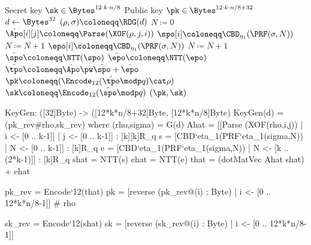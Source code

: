 \begin{algorithm}
  \caption{$\KyberCPAPKE.\PKEGen()$: key generation
  \label{kybercpa-gen}}
  \begin{algorithmic}[1]
    \Ensure Secret key $\sk \in \Bytes^{12\cdot k\cdot n/8}$
    \Ensure Public key $\pk \in \Bytes^{12\cdot k\cdot n/8 + 32}$
    \State $d \gets \Bytes^{32}$                  \label{line:secretrandomness}
    \State $(\rho, \sigma) \coloneqq \ROG(d)$ 
    \State $N \coloneqq 0$
               
      \State $\hat{\Apo}[i][j] \coloneqq \Parse(\XOF(\rho, j, i))$
    \EndFor
    \EndFor
               
    \State $\spo[i] \coloneqq \CBD_{\eta_1}(\PRF(\sigma, N))$
    \State $N \coloneqq N+1$
    \EndFor
               
    \State $\epo[i] \coloneqq \CBD_{\eta_1}(\PRF(\sigma, N))$
    \State $N \coloneqq N+1$
    \EndFor
    \State $\hat{\spo} \coloneqq \NTT(\spo)$\label{line:kybercpa-gen:ntts}
    \State $\hat{\epo} \coloneqq \NTT(\epo)$
    \State $\hat{\tpo} \coloneqq \hat{\Apo} \pw \hat{\spo} + \hat{\epo}$\label{line:kybercpa-gen:invnttas}
    \State $\pk \coloneqq (\Encode_{12}(\hat{\tpo} \modp q)\cat\rho)$\Comment{$\pk \coloneqq \Apo\spo + \epo$}
    \State $\sk \coloneqq \Encode_{12}(\hat{\spo} \modp q)$\Comment{$\sk \coloneqq \spo$}
    \State \Return $(\pk, \sk)$
  \end{algorithmic}
\end{algorithm}

\begin{code}
  KeyGen: ([32]Byte) -> ([12*k*n/8+32]Byte, [12*k*n/8]Byte)
  KeyGen(d) = (pk_rev#rho,sk_rev) where
    (rho,sigma) = G(d)
    Ahat = [[Parse (XOF(rho,i,j)) | i <- [0 .. k-1]] | j <- [0 .. k-1]] : [k][k]R_q
    s = [CBD`{eta_1}(PRF`{eta_1}(sigma,N)) | N <- [0 .. k-1]] : [k]R_q
    e = [CBD`{eta_1}(PRF`{eta_1}(sigma,N)) | N <- [k .. (2*k-1)]] : [k]R_q
    shat = NTT(s)
    ehat = NTT(e)
    that = (dotMatVec Ahat shat) + ehat
    
    pk_rev = Encode`{12}(that)
    pk = [reverse (pk_rev@(i) : Byte) | i <- [0 .. 12*k*n/8-1]] # rho

    sk_rev = Encode`{12}(shat)
    sk = [reverse (sk_rev@(i) : Byte) | i <- [0 .. 12*k*n/8-1]]

\end{code}

